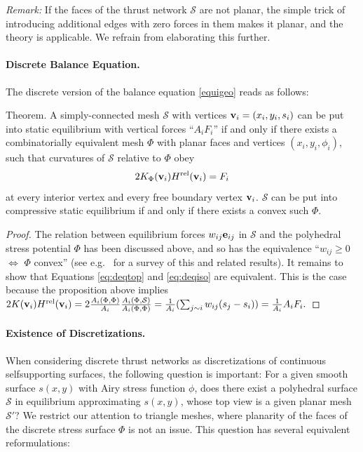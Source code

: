 \documentclass[review]{acmsiggraph}
\def\rel{{\mathord{{\rm rel}}}}
\def\SS{{\mathcal S}}
\begin{document}
{\em Remark:} If the faces of the thrust network $\SS$ are not planar,
the simple trick of introducing additional edges with zero forces in them
makes it planar, and the theory is applicable. We refrain from elaborating
this further.


\paragraph{Discrete Balance Equation.}

The discrete version of the balance equation \eqref{equigeo} reads as 
follows:

\proclaim Theorem.
 A simply-connected mesh $\SS$ with vertices ${\mathbf v}_i=(x_i,y_i,s_i)$
can be put into static equilibrium with vertical forces ``$A_iF_i$'' if
and only if there exists a combinatorially equivalent mesh $\Phi$ with
planar faces and vertices $(x_i,y_i,\phi_i)$, such that curvatures of
$\SS$ relative to $\Phi$ obey
	\begin{equation}
	2 K_\Phi(\vw_i) H^\rel(\vw_i) = F_i
	\label{eq:deqiso}
	\end{equation}
 at every interior vertex and every free boundary vertex ${\mathbf v}_i$. $\SS$
can be put into compressive static equilibrium if and only if there exists
a convex such $\Phi$.

\begin{proof} The relation between equilibrium forces $w_{ij}{\mathbf e}_{ij}$ in 
$\SS$ and the polyhedral stress potential $\Phi$ has been discussed above, 
and so has the equivalence ``$w_{ij}\ge 0$ $\iff$ $\Phi$ convex'' (see 
e.g.\ \cite{Ash1988} for a survey of this and related results). It remains 
to show that Equations \eqref{eq:deqtop} and \eqref{eq:deqiso} are 
equivalent. This is the case because the proposition above implies
	$
	2 K(\vw_i) H^\rel(\vw_i) =
	2 \frac{A_i(\Phi,\Phi)}{A_i}
	\frac{A_i(\Phi,\SS)}{A_i(\Phi,\Phi)} =
	{1\over A_i}
	(\sum_{j\sim i} w_{ij} (s_j-s_i))
	= {1\over A_i} A_i F_i.
	$
	\end{proof}

\paragraph{Existence of Discretizations.}

When considering discrete thrust networks as discretizations of continuous 
self\dash supporting surfaces, the following question is important: For a 
given smooth surface $s(x,y)$ with Airy stress function $\phi$, does there 
exist a polyhedral surface $\SS$ in equilibrium approximating $s(x,y)$, 
whose top view is a given planar mesh $\SS'$? We restrict our attention to 
triangle meshes, where planarity of the faces of the discrete stress 
surface $\Phi$ is not an issue. This question has several equivalent 
reformulations:
\end{document}
